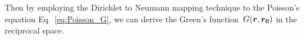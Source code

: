 

Then by employing the Dirichlet to Neumann mapping technique to the Poisson's equation Eq.~\eqref{eq:Poisson_G}, we can derive the Green's function~$G(\boldsymbol{r}, \boldsymbol{r_0})$ in the reciprocal space. 

